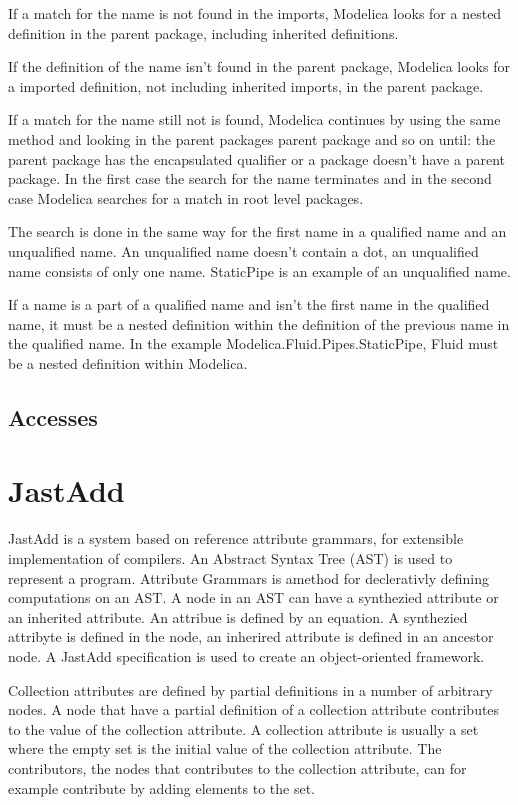 \documentclass{cslthse-msc}
\begin{document}
If a match for the name is not found in the imports, Modelica looks for a nested definition in the parent package, including inherited definitions.

If the definition of the name isn't found in the parent package, Modelica looks for a imported definition, not including inherited imports, in the parent package.

If a match for the name still not is found, Modelica continues by using the same method and looking in the parent packages parent package and so on until: the parent package has the encapsulated qualifier or a package doesn't have a parent package. In the first case the search for the name terminates and in the second case Modelica searches for a match in root level packages.

The search is done in the same way for the first name in a qualified name and an unqualified name. An unqualified name doesn't contain a dot, an unqualified name consists of only one name. StaticPipe is an example of an unqualified name.

If a name is a part of a qualified name and isn't the first name in the qualified name, it must be a nested definition within the definition of the previous name in the qualified name. In the example Modelica.Fluid.Pipes.StaticPipe, Fluid must be a nested definition within Modelica.\cite{modelicamodelica, tillermodelica}

\subsection{Accesses}

\section{JastAdd}
JastAdd is a system based on reference attribute grammars, for extensible implementation of compilers. An Abstract Syntax Tree (AST) is used to represent a program. Attribute Grammars is amethod for declerativly defining computations on an AST. A node in an AST can have a synthezied attribute or an inherited attribute. An attribue is defined by an equation. A synthezied attribyte is defined in the node, an inherired attribute is defined in an ancestor node. A JastAdd specification is used to create an object-oriented framework.~\cite{aakesson2008development}

Collection attributes are defined by partial definitions in a number of arbitrary nodes. A node that have a partial definition of a collection attribute contributes to the value of the collection attribute. A collection attribute is usually a set where the empty set is the initial value of the collection attribute. The contributors, the nodes that contributes to the collection attribute, can for example contribute by adding elements to the set.~\cite{magnusson2007extending}
\end{document}
